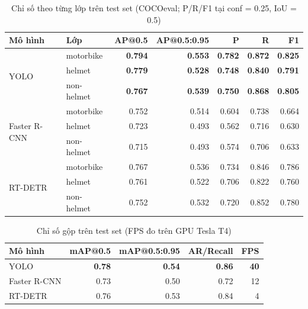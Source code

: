 \begin{table}[H]
    \centering
    \small
    \caption{Chỉ số theo từng lớp trên test set (COCOeval; P/R/F1 tại conf = 0.25, IoU = 0.5)}
    \label{tab:per-class-comparison}
    \begin{tabular}{llrrrrr}
        \toprule
        \textbf{Mô hình} & \textbf{Lớp} & \textbf{AP@0.5} & \textbf{AP@0.5:0.95} & \textbf{P} & \textbf{R} & \textbf{F1} \\
        \midrule
        \multirow{3}{*}{YOLO}
          & motorbike   & \textbf{0.794} & \textbf{0.553} & \textbf{0.782} & \textbf{0.872} & \textbf{0.825} \\
          & helmet      & \textbf{0.779} & \textbf{0.528} & \textbf{0.748} & \textbf{0.840} & \textbf{0.791} \\
          & non-helmet  & \textbf{0.767} & \textbf{0.539} & \textbf{0.750} & \textbf{0.868} & \textbf{0.805} \\
        \midrule
        \multirow{3}{*}{Faster R-CNN}
          & motorbike   & 0.752 & 0.514 & 0.604 & 0.738 & 0.664 \\
          & helmet      & 0.723 & 0.493 & 0.562 & 0.716 & 0.630 \\
          & non-helmet  & 0.715 & 0.493 & 0.574 & 0.706 & 0.633 \\
        \midrule
        \multirow{3}{*}{RT-DETR}
          & motorbike   & 0.767 & 0.536 & 0.734 & 0.846 & 0.786 \\
          & helmet      & 0.761 & 0.522 & 0.706 & 0.822 & 0.760 \\
          & non-helmet  & 0.752 & 0.532 & 0.720 & 0.852 & 0.780 \\
        \bottomrule
    \end{tabular}
\end{table}

\begin{table}[H]
    \centering
    \small
    \caption{Chỉ số gộp trên test set (FPS đo trên GPU Tesla T4)}
    \label{tab:test-comparison}
    \begin{tabular}{lrrrr}
        \toprule
        \textbf{Mô hình} & \textbf{mAP@0.5} & \textbf{mAP@0.5:0.95} & \textbf{AR/Recall} & \textbf{FPS} \\
        \midrule
        YOLO & \textbf{0.78} & \textbf{0.54} & \textbf{0.86} & \textbf{40} \\
        Faster R-CNN & 0.73 & 0.50 & 0.72 & 12 \\
        RT-DETR & 0.76 & 0.53 & 0.84 & 4 \\
        \bottomrule
    \end{tabular}
\end{table}

